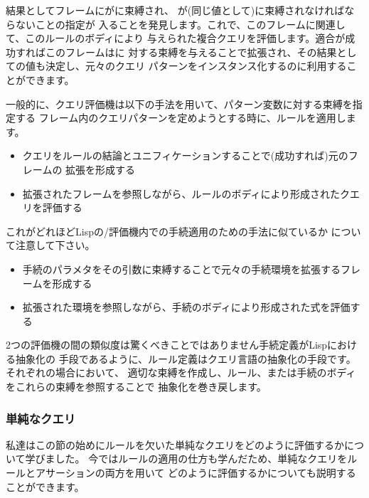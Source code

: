 \noindent
結果としてフレームにがに束縛され、
が(同じ値として)に束縛されなければならないことの指定が
入ることを発見します。これで、このフレームに関連して、このルールのボディにより
与えられた複合クエリを評価します。適合が成功すればこのフレームはに
対する束縛を与えることで拡張され、その結果としての値も決定し、元々のクエリ
パターンをインスタンス化するのに利用することができます。


一般的に、クエリ評価機は以下の手法を用いて、パターン変数に対する束縛を指定する
フレーム内のクエリパターンを定めようとする時に、ルールを適用します。

\begin{itemize}

\item
クエリをルールの結論とユニフィケーションすることで(成功すれば)元のフレームの
拡張を形成する

\item
拡張されたフレームを参照しながら、ルールのボディにより形成されたクエリを評価する

\end{itemize}

\noindent
これがどれほどLispの/評価機内での手続適用のための手法に似ているか
について注意して下さい。

\begin{itemize}

\item
手続のパラメタをその引数に束縛することで元々の手続環境を拡張するフレームを形成する

\item
拡張された環境を参照しながら、手続のボディにより形成された式を評価する

\end{itemize}

\noindent
2つの評価機の間の類似度は驚くべきことではありません手続定義がLispにおける抽象化の
手段であるように、ルール定義はクエリ言語の抽象化の手段です。それぞれの場合において、
適切な束縛を作成し、ルール、または手続のボディをこれらの束縛を参照することで
抽象化を巻き戻します。

\subsubsection*{単純なクエリ}


私達はこの節の始めにルールを欠いた単純なクエリをどのように評価するかについて学びました。
今ではルールの適用の仕方も学んだため、単純なクエリをルールとアサーションの両方を用いて
どのように評価するかについても説明することができます。


